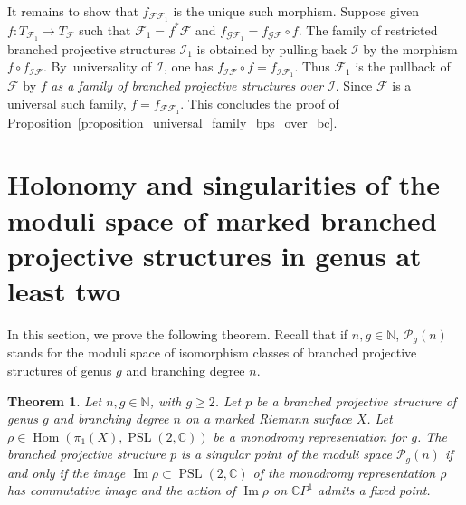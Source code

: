 \documentclass[JEP,XML,SOM,Unicode,NoEqCountersInSection,published]{cedram}
\newcommand{\C}{\mathbb C}
\newcommand{\N}{\mathbb N}
\newcommand{\CP}{\mathbb CP}
\DeclareMathOperator{\Hom}{Hom}
\DeclareMathOperator{\Image}{Im}
\DeclareMathOperator{\PSL}{PSL}
\theoremstyle{definition}
\theoremstyle{plain}
\newtheorem{theorem}[definition]{Theorem}
\begin{document}
It remains to show that $f_{\mathcal F \mathcal F_1}$ is the unique such morphism.
Suppose given $f: T_{\mathcal F_1} \to T_{\mathcal F}$ such that $\mathcal F_1 = f^* \mathcal F$ and $f_{\mathcal G \mathcal F_1} = f_{\mathcal G \mathcal F} \circ f$.
The family of restricted branched projective structures $\mathcal I_1$ is obtained by pulling back $\mathcal I$ by the morphism $f \circ f_{\mathcal I \mathcal F}$.
By~universality of $\mathcal I$, one has $f_{\mathcal I \mathcal F} \circ f = f_{\mathcal I \mathcal F_1}$.
Thus $\mathcal F_1$ is the pullback of $\mathcal F$ by $f$ \emph{as a family of branched projective structures over $\mathcal I$}.
Since $\mathcal F$ is a universal such family, $f = f_{\mathcal F \mathcal F_1}$.
This concludes the proof of Proposition~\ref{proposition_universal_family_bps_over_bc}.

\section{Holonomy and singularities of the moduli space of marked branched\texorpdfstring{\newline}{} projective structures in genus at least two}\label{section_singular_points}

In this section, we prove the following theorem. Recall that if $n, g \in \N$, $\mathcal P_g(n)$ stands for the moduli space of isomorphism classes of branched projective structures of genus $g$ and branching degree $n$.

\begin{theorem}\label{theorem_singular_points}
Let $n, g \in \N$, with $g \ge 2$.
Let $p$ be a branched projective structure of genus $g$ and branching degree $n$ on a marked Riemann surface $X$.
Let $\rho \in \Hom(\pi_1(X), \PSL(2, \C))$ be a monodromy representation for $g$.
The branched projective structure $p$ is a singular point of the moduli space $\mathcal P_g(n)$ if and only if the image $\Image \rho \subset \PSL(2, \C)$ of the monodromy representation $\rho$ has commutative image and the action of $\Image \rho$ on $\CP^1$ admits a fixed point.
\end{theorem}
\end{document}
